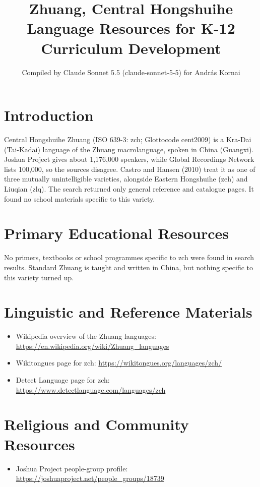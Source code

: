 \documentclass[12pt]{article}
\title{Zhuang, Central Hongshuihe Language Resources for K-12 Curriculum Development}
\author{Compiled by Claude Sonnet 5.5 (claude-sonnet-5-5) for Andr\'as Kornai}
\date{}
\begin{document}
\maketitle

\section{Introduction}
Central Hongshuihe Zhuang (ISO 639-3: zch; Glottocode cent2009) is a Kra-Dai (Tai-Kadai) language of the Zhuang macrolanguage, spoken in China (Guangxi). Joshua Project gives about 1,176,000 speakers, while Global Recordings Network lists 100,000, so the sources disagree. Castro and Hansen (2010) treat it as one of three mutually unintelligible varieties, alongside Eastern Hongshuihe (zeh) and Liuqian (zlq). The search returned only general reference and catalogue pages. It found no school materials specific to this variety.

\section{Primary Educational Resources}
No primers, textbooks or school programmes specific to zch were found in search results. Standard Zhuang is taught and written in China, but nothing specific to this variety turned up.

\section{Linguistic and Reference Materials}
\begin{itemize}
\item Wikipedia overview of the Zhuang languages: \url{https://en.wikipedia.org/wiki/Zhuang_languages}
\item Wikitongues page for zch: \url{https://wikitongues.org/languages/zch/}
\item Detect Language page for zch: \url{https://www.detectlanguage.com/languages/zch}
\end{itemize}

\section{Religious and Community Resources}
\begin{itemize}
\item Joshua Project people-group profile: \url{https://joshuaproject.net/people_groups/18739}
\end{itemize}
\end{document}
